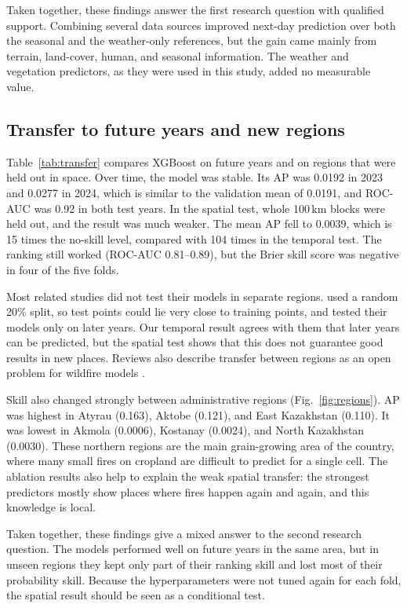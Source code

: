 Taken together, these findings answer the first research question with qualified support. Combining several data sources improved next-day prediction over both the seasonal and the weather-only references, but the gain came mainly from terrain, land-cover, human, and seasonal information. The weather and vegetation predictors, as they were used in this study, added no measurable value.

\subsection{Transfer to future years and new regions}\label{sec:res_transfer}

Table~\ref{tab:transfer} compares XGBoost on future years and on regions that were held out in space. Over time, the model was stable. Its AP was 0.0192 in 2023 and 0.0277 in 2024, which is similar to the validation mean of 0.0191, and ROC-AUC was 0.92 in both test years. In the spatial test, whole 100\,km blocks were held out, and the result was much weaker. The mean AP fell to 0.0039, which is 15 times the no-skill level, compared with 104 times in the temporal test. The ranking still worked (ROC-AUC 0.81--0.89), but the Brier skill score was negative in four of the five folds.

Most related studies did not test their models in separate regions. \cite{ouazri2026catboost} used a random 20\% split, so test points could lie very close to training points, and \cite{jadouli2024morocco,chepashev2025maxent} tested their models only on later years. Our temporal result agrees with them that later years can be predicted, but the spatial test shows that this does not guarantee good results in new places. Reviews also describe transfer between regions as an open problem for wildfire models \cite{xu2025deep,galvanlara2026systematic}.

Skill also changed strongly between administrative regions (Fig.~\ref{fig:regions}). AP was highest in Atyrau (0.163), Aktobe (0.121), and East Kazakhstan (0.110). It was lowest in Akmola (0.0006), Kostanay (0.0024), and North Kazakhstan (0.0030). These northern regions are the main grain-growing area of the country, where many small fires on cropland are difficult to predict for a single cell. The ablation results also help to explain the weak spatial transfer: the strongest predictors mostly show places where fires happen again and again, and this knowledge is local.

Taken together, these findings give a mixed answer to the second research question. The models performed well on future years in the same area, but in unseen regions they kept only part of their ranking skill and lost most of their probability skill. Because the hyperparameters were not tuned again for each fold, the spatial result should be seen as a conditional test.

